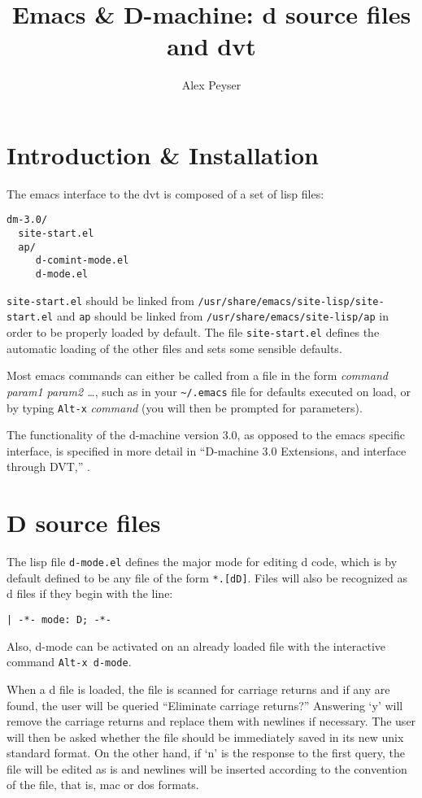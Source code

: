 \documentclass[12pt]{article}
\title{Emacs \& D-machine: d source files and dvt}
\author{Alex Peyser}
\begin{document}
\maketitle
{}\tableofcontents{}
\newpage
\setlength{\parindent}{0pt}
\setlength{\parskip}{6pt}
\section{Introduction \& Installation}

The emacs interface to the dvt is composed of a set of lisp files:
\begin{verbatim}
dm-3.0/
  site-start.el
  ap/
     d-comint-mode.el
     d-mode.el
\end{verbatim}
\texttt{site-start.el} should be linked from
\texttt{/usr/share/emacs/site-lisp/site-start.el} and \texttt{ap}
should be linked from \texttt{/usr/share/emacs/site-lisp/ap} in order
to be properly loaded by default. The file \texttt{site-start.el}
defines the automatic loading of the other files and sets some
sensible defaults.
  
Most emacs commands can either be called from a file in the form
\emph{command param1 param2 \dots}, such as in your
{\tt\verb$~/.$emacs} file for defaults executed on load, or by typing
\verb$Alt-x$ \emph{command} (you will then be prompted for
parameters).

The functionality of the d-machine version 3.0, as opposed to the
emacs specific interface, is specified in more detail in ``D-machine
3.0 Extensions, and interface through DVT,'' \citep{dvt-3.0}.

\section{D source files}
  
The lisp file \texttt{d-mode.el} defines the major mode for editing d
code, which is by default defined to be any file of the form
\verb$*.[dD]$.  Files will also be recognized as d files if they begin
with the line:
\begin{verbatim}
| -*- mode: D; -*-
\end{verbatim}
Also, d-mode can be activated on an already loaded file with the interactive
command \verb$Alt-x d-mode$.

When a d file is loaded, the file is scanned for carriage returns and
if any are found, the user will be queried ``Eliminate carriage
returns?'' Answering `y' will remove the carriage returns and replace
them with newlines if necessary. The user will then be asked whether
the file should be immediately saved in its new unix standard format.
On the other hand, if `n' is the response to the first query, the file
will be edited as is and newlines will be inserted according to the
convention of the file, that is, mac or dos formats.
\end{document}
